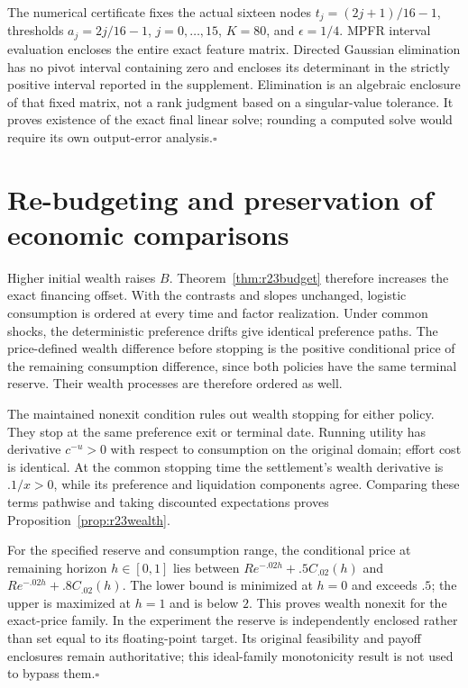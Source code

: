 The numerical certificate fixes the actual sixteen nodes $t_j=(2j+1)/16-1$, thresholds $a_j=2j/16-1$, $j=0,\ldots,15$, $K=80$, and $\epsilon=1/4$. MPFR interval evaluation encloses the entire exact feature matrix. Directed Gaussian elimination has no pivot interval containing zero and encloses its determinant in the strictly positive interval reported in the supplement. Elimination is an algebraic enclosure of that fixed matrix, not a rank judgment based on a singular-value tolerance. It proves existence of the exact final linear solve; rounding a computed solve would require its own output-error analysis.\hfill$\square$

\section{Re-budgeting and preservation of economic comparisons}\label{app:r23wealth}
Higher initial wealth raises $B$. Theorem~\ref{thm:r23budget} therefore increases the exact financing offset. With the contrasts and slopes unchanged, logistic consumption is ordered at every time and factor realization. Under common shocks, the deterministic preference drifts give identical preference paths. The price-defined wealth difference before stopping is the positive conditional price of the remaining consumption difference, since both policies have the same terminal reserve. Their wealth processes are therefore ordered as well.

The maintained nonexit condition rules out wealth stopping for either policy. They stop at the same preference exit or terminal date. Running utility has derivative $c^{-u}>0$ with respect to consumption on the original domain; effort cost is identical. At the common stopping time the settlement's wealth derivative is $.1/x>0$, while its preference and liquidation components agree. Comparing these terms pathwise and taking discounted expectations proves Proposition~\ref{prop:r23wealth}.

For the specified reserve and consumption range, the conditional price at remaining horizon $h\in[0,1]$ lies between $R e^{-.02h}+.5C_{.02}(h)$ and $R e^{-.02h}+.8C_{.02}(h)$. The lower bound is minimized at $h=0$ and exceeds $.5$; the upper is maximized at $h=1$ and is below $2$. This proves wealth nonexit for the exact-price family. In the experiment the reserve is independently enclosed rather than set equal to its floating-point target. Its original feasibility and payoff enclosures remain authoritative; this ideal-family monotonicity result is not used to bypass them.\hfill$\square$
